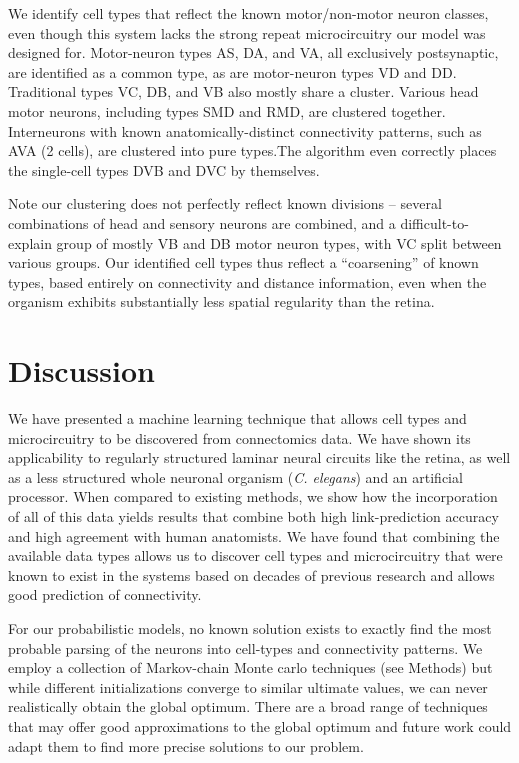 \documentclass{article}
\begin{document}
We identify cell types that reflect the known motor/non-motor neuron
classes, even though this system lacks the strong repeat
microcircuitry our model was designed for.  Motor-neuron types AS, DA,
and VA, all exclusively postsynaptic, are identified as a common type,
as are motor-neuron types VD and DD. Traditional types VC, DB, and VB
also mostly share a cluster. Various head motor neurons, including
types SMD and RMD, are clustered together. Interneurons with known
anatomically-distinct connectivity patterns, such as AVA (2 cells),
are clustered into pure types.The algorithm even correctly places the
single-cell types DVB and DVC by themselves.

Note our clustering does not perfectly reflect known divisions --
several combinations of head and sensory neurons are combined, and a
difficult-to-explain group of mostly VB and DB motor neuron types,
with VC split between various groups. Our identified cell types thus
reflect a ``coarsening'' of known types, based entirely on
connectivity and distance information, even when the organism exhibits
substantially less spatial regularity than the retina.


\section*{Discussion}
We have presented a machine learning technique that allows cell types
and microcircuitry to be discovered from connectomics data.  We have
shown its applicability to regularly structured laminar neural
circuits like the retina, as well as a less structured whole neuronal
organism (\textit{C. elegans}) and an artificial processor. When
compared to existing methods, we show how the incorporation of all of
this data yields results that combine both high link-prediction
accuracy and high agreement with human anatomists. We have found that
combining the available data types allows us to discover cell types
and microcircuitry that were known to exist in the systems based on
decades of previous research and allows good prediction of
connectivity.

For our probabilistic models, no known solution exists to
exactly find the most probable parsing of the neurons into cell-types
and connectivity patterns. We employ a collection of Markov-chain
Monte carlo techniques (see Methods) but while different
initializations converge to similar ultimate values, we can never
realistically obtain the global optimum. There are a broad range of
techniques that may offer good approximations to the global optimum
and future work could adapt them to
find more precise solutions to our problem.
\end{document}
